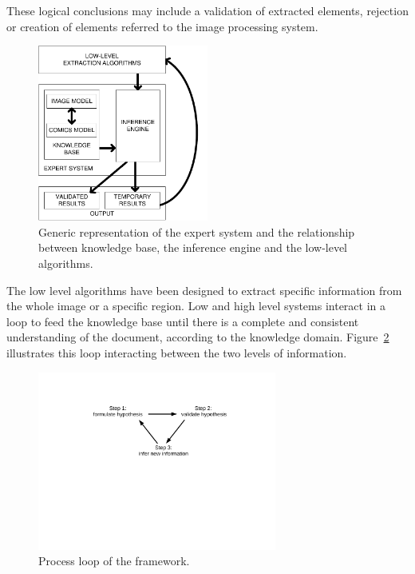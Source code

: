 These logical conclusions may include a validation of extracted elements, rejection or creation of elements referred to the image processing system.


 \begin{figure}[!ht]  %
   \centering
  \includegraphics[trim= 0px 0px 0px 0px, clip, width=0.5\textwidth]{expert_system.pdf}
  \caption[Generic representation of the expert system and the relationship between knowledge base, the inference engine and the low-level algorithms]{Generic representation of the expert system and the relationship between knowledge base, the inference engine and the low-level algorithms.}
  \label{fig:kn:generic_expert_system}
 \end{figure}

The low level algorithms have been designed to extract specific information from the whole image or a specific region.
Low and high level systems interact in a loop to feed the knowledge base until there is a complete and consistent understanding of the document, according to the knowledge domain. 
Figure~\ref{fig:kn:process_loop} illustrates this loop interacting between the two levels of information.

 \begin{figure}[!ht]  %
   \centering
  \includegraphics[trim= 140px 315px 100px 95px, clip, width=0.7\textwidth]{process_loop.pdf}
  \caption[Process loop of the knowledge-driven system]{Process loop of the framework.}
  \label{fig:kn:process_loop}
 \end{figure}

